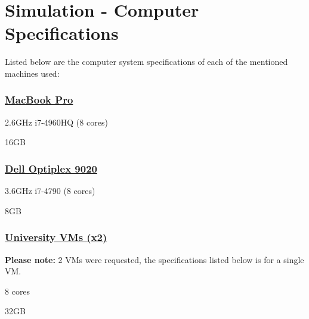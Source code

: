 \section{Simulation - Computer Specifications}\label{sec:power}
Listed below are the computer system specifications of each of the mentioned machines used:
\subsubsection{\underline{MacBook Pro}}
\begin{description}[leftmargin=8em,style=nextline]
  \item[Processor] 2.6GHz i7-4960HQ (8 cores)
  \item[RAM] 16GB
\end{description}

\subsubsection{\underline{Dell Optiplex 9020}}
\begin{description}[leftmargin=8em,style=nextline]
  \item[Processor] 3.6GHz i7-4790 (8 cores)
  \item[RAM] 8GB
\end{description}

\subsubsection{\underline{University VMs (x2)}}
\textbf{Please note:} 2 VMs were requested, the specifications listed below is for a single VM.
\begin{description}[leftmargin=8em,style=nextline]
  \item[Processor] 8 cores
  \item[RAM] 32GB
\end{description}
